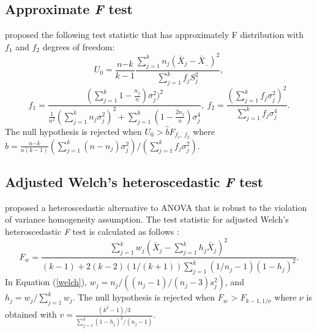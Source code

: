 \subsection{Approximate \textit{F} test}
\cite{asiribo1990coping} proposed the following test statistic that has approximately F distribution with $f_{1}$ and $f_{2}$ degrees of freedom:
\begin{equation}
U_{0}=\frac{{n}{-k}}{k-1}\frac{{\displaystyle\sum\limits_{j=1}^k {n_{j}{(\bar{X}_{j}-\bar{X}_{..})^2}}}{}}{{\displaystyle\sum\limits_{j=1}^k f_jS_j^2}},
\end{equation}
\begin{equation*}
f_1=\frac{(\displaystyle\sum\limits_{j=1}^k 1-\frac{n_j}{n} )\sigma_j^2)^2}{\frac{1}{n^2}(\displaystyle\sum\limits_{j=1}^k n_j\sigma_j^2)^2+\displaystyle\sum\limits_{j=1}^k (1-\frac{2n_j}{n})\sigma_j^4}  , \         f_2=\frac{(\displaystyle\sum\limits_{j=1}^k f_j\sigma_j^2)^2}{\displaystyle\sum\limits_{j=1}^k f_j\sigma_j^4}.
\end{equation*}  
The null hypothesis is rejected when
\begin{math} U_{0}>\hat{b}F_{f_{1},\ f_{2}} \end{math} where \begin{math}
b=\frac{{n}{-k}}{n(k-1)}({\displaystyle\sum\limits_{j=1}^k (n-n_j)\sigma_j^2})/({\displaystyle\sum\limits_{j=1}^k f_j\sigma_j^2}).
\end{math}

\subsection{Adjusted Welch's heteroscedastic \textit{F} test}
\citet{WELCH:1951} proposed a heteroscedastic alternative to ANOVA that is robust to the violation of variance homogeneity assumption. The test statistic for adjusted Welch's heteroscedastic \textit{F} test is calculated as follows \cite{cavus2021testing}: 
\begin{equation}\label{welch}	
F_w=\frac{\displaystyle\sum_{j=1}^kw_{j}(\bar{X}_{j}-\sum_{j=1}^kh_{j}\bar{X}_{j})^2}{(k-1)+2(k-2)(1/(k+1))\displaystyle\sum_{j=1}^k(1/n_{j}-1)(1-h_{j})^2}.
\end{equation}
In Equation (\ref{welch}), \begin{math}w_{j}=n_{j}/((n_{j}-1)/(n_{j}-3)s_j^2)\end{math},
and \begin{math}h_{j}=w_{j}/\displaystyle\sum_{j=1}^kw_{j}\end{math}.  
The null hypothesis is rejected when $F_w$ > $F_{{k-1},  1/ \nu}$ where $\nu$ is obtained with  \begin{math}
v=\frac{(k^2-1)/3}{\displaystyle\sum_{j=1}^k(1-h_{j})^2/(n_{j}-1)}
\end{math}.



